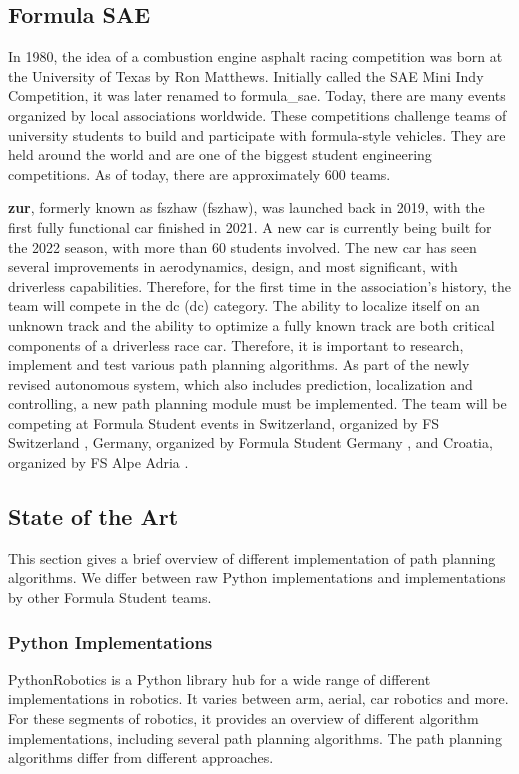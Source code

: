 \subsection{Formula SAE}
In 1980, the idea of a combustion engine asphalt racing competition was born at the University of Texas by Ron Matthews. Initially called the SAE Mini Indy Competition, it was later renamed to \Gls{formula_sae}. Today, there are many events organized by local associations worldwide.
\cite{formula_sae}
These competitions challenge teams of university students to build and participate with formula-style vehicles. They are held around the world and are one of the biggest student engineering competitions. As of today, there are approximately 600 teams. \cite{sae_student_events}

\textbf{\acrlong{zur}}, formerly known as \acrlong{fszhaw} (\acrshort{fszhaw}), was launched back in 2019, with the first fully functional car finished in 2021. A new car is currently being built for the 2022 season, with more than 60 students involved. The new car has seen several improvements in aerodynamics, design, and most significant, with driverless capabilities. \cite{fszhaw_launch}
Therefore, for the first time in the association's history, the team will compete in the \acrlong{dc} (\acrshort{dc}) category.
The ability to localize itself on an unknown track and the ability to optimize a fully known track are both critical components of a driverless race car. Therefore, it is important to research, implement and test various path planning algorithms. As part of the newly revised autonomous system, which also includes prediction, localization and controlling, a new path planning module must be implemented.
The team will be competing at Formula Student events in Switzerland, organized by FS Switzerland \cite{fsswitzerland}, Germany, organized by Formula Student Germany \cite{fs_germany}, and Croatia, organized by FS Alpe Adria \cite{fs_alpe_adria}.

\subsection{State of the Art} \label{sec:State of the Art}
This section gives a brief overview of different implementation of path planning algorithms. We differ between raw Python implementations and implementations by other Formula Student teams.

\subsubsection{Python Implementations} \label{sec:Python Implementations}
PythonRobotics is a Python library hub for a wide range of different implementations in robotics. It varies between arm, aerial, car robotics and more.
For these segments of robotics, it provides an overview of different algorithm implementations, including several path planning algorithms.
The path planning algorithms differ from different approaches.
\cite{python_robotics}

